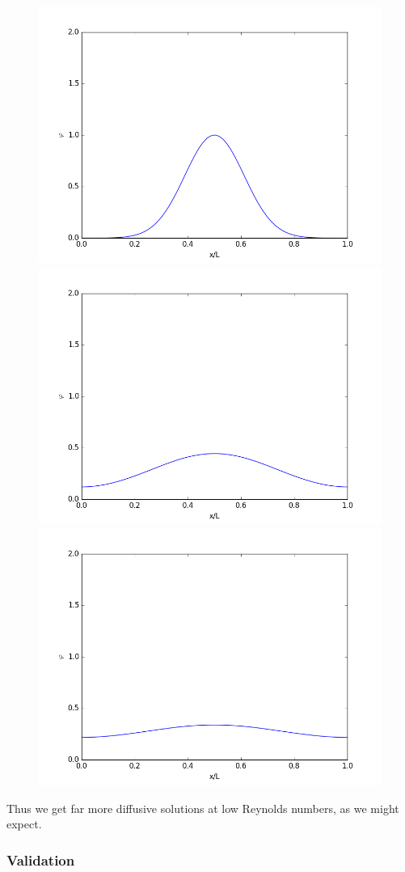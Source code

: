 \documentclass[12pt]{article}
\begin{document}
\begin{figure}[H]
\includegraphics[width=.32\hsize]{burgers2-0.png} \includegraphics[width=.32\hsize]{burgers2-2500.png} \includegraphics[width=.32\hsize]{burgers2-5000.png}
\end{figure}
\noindent Thus we get far more diffusive solutions at low Reynolds numbers, as we might expect.

\subsubsection{Validation}
\end{document}
